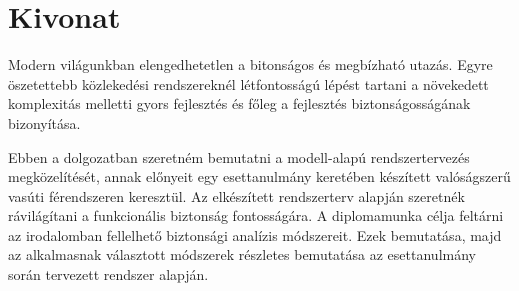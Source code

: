 \setcounter{page}{1}

\selecthungarian

\chapter*{Kivonat}
Modern világunkban elengedhetetlen a bitonságos és megbízható utazás.
Egyre öszetettebb közlekedési rendszereknél létfontosságú lépést tartani a növekedett komplexitás melletti gyors fejlesztés és főleg a fejlesztés biztonságosságának bizonyítása.

Ebben a dolgozatban szeretném bemutatni a modell-alapú rendszertervezés megközelítését, annak előnyeit egy esettanulmány keretében készített valóságszerű vasúti férendszeren keresztül.
Az elkészített rendszerterv alapján szeretnék rávilágítani a funkcionális biztonság fontosságára.
A diplomamunka célja feltárni az irodalomban fellelhető biztonsági analízis módszereit. 
Ezek bemutatása, majd az alkalmasnak választott módszerek részletes bemutatása az esettanulmány során tervezett rendszer alapján.


\vfill





\cleardoublepage

\selectthesislanguage

\setcounter{romanPage}{\value{page}}

